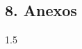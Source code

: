 \begin{spacing}{1.5}
  \begin{tightcenter}
    \section{8. Anexos}
    \mylinespacing
  \end{tightcenter}

  \mylinespacing
  \mylinespacing
  \begin{tightcenter}
  \end{tightcenter}
\end{spacing}{1.5}
